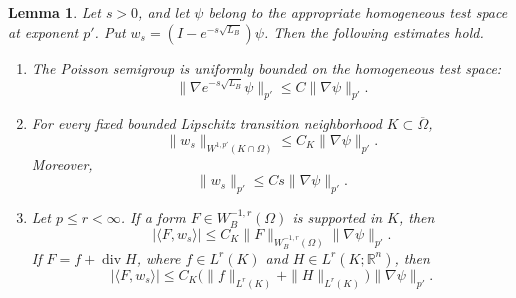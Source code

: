 \documentclass[12pt]{amsart}
\newcommand{\diver}{\operatorname{div}}
\newtheorem{lemma}[theorem]{Lemma}
\theoremstyle{remark}
\begin{document}
\begin{lemma}
\label{lem:homogeneous-Poisson-tests}
Let \(s>0\), and let \(\psi\) belong to the appropriate homogeneous
test space at exponent \(p'\).  Put $w_s=(I-e^{-s\sqrt{L_B}})\psi$. Then the following estimates hold.

\begin{enumerate}[label=\textup{(\roman*)},leftmargin=*]
\item The Poisson semigroup is uniformly bounded on the homogeneous
test space:
\[
 \|\nabla e^{-s\sqrt{L_B}}\psi\|_{p'}
 \leq C\|\nabla\psi\|_{p'}.
\]

\item For every fixed bounded Lipschitz transition neighborhood
\(K\subset\overline\Omega\),
\begin{equation}\label{eq:homogeneous-Poisson-local}
 \|w_s\|_{W^{1,p'}(K\cap\Omega)}
 \leq C_K\|\nabla\psi\|_{p'}.
\end{equation}
Moreover,
\begin{equation}\label{eq:homogeneous-Poisson-global}
 \|w_s\|_{p'}
 \leq Cs\|\nabla\psi\|_{p'}.
\end{equation}

\item Let \(p\leq r<\infty\).  If a form
\(F\in W_B^{-1,r}(\Omega)\) is supported in \(K\), then
\begin{equation}\label{eq:compact-form-test}
 |\langle F,w_s\rangle|
 \leq C_K\|F\|_{W_B^{-1,r}(\Omega)}
       \|\nabla\psi\|_{p'}.
\end{equation}
If \(F=f+\diver H\), where \(f\in L^r(K)\) and
\(H\in L^r(K;\mathbb R^n)\), then
\[
 |\langle F,w_s\rangle|
 \leq C_K\bigl(\|f\|_{L^r(K)}+\|H\|_{L^r(K)}\bigr)
       \|\nabla\psi\|_{p'}.
\]
\end{enumerate}
\end{lemma}
\end{document}
